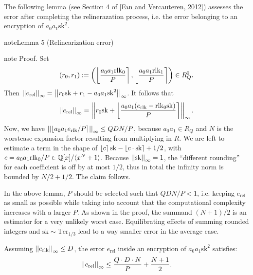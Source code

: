 \documentclass[letterpaper,10pt,english]{jupyterBook}
\begin{document}
\sphinxAtStartPar
The following lemma (see Section 4 of {[}\hyperlink{cite.Thesis:id70}{Fan and Vercauteren, 2012}{]}) assesses the error after completing the relinerazation process, i.e. the error belonging to an encryption of \(a_0a_1\mathrm{sk}^2\).
\label{Thesis:relinearization-error}
\begin{sphinxadmonition}{note}{Lemma 5 (Relinearization error)}
\end{sphinxadmonition}

\begin{sphinxadmonition}{note}
\sphinxAtStartPar
Proof. Set
\begin{equation*}
\begin{split}(r_0,r_1) := \left( \left\lfloor \frac{a_0a_1 \mathrm{rlk}_0}{P} \right\rceil, \left\lfloor \frac{a_0a_1 \mathrm{rlk}_1}{P} \right\rceil \right) \in R_Q^2.\end{split}
\end{equation*}
\sphinxAtStartPar
Then \(\left\lvert\left\lvert e_{\text{rel}} \right\rvert\right\rvert_\infty = \left\lvert\left\lvert r_0 \mathrm{sk} + r_1 - a_0a_1\mathrm{sk}^2 \right\rvert\right\rvert_\infty\).
It follows that
\begin{equation*}
\begin{split}\left\lvert\left\lvert e_{\text{rel}} \right\rvert\right\rvert_\infty = \left\lvert\left\lvert r_0 \mathrm{sk} + \left\lfloor \frac{a_0a_1(e_{\text{rlk}} - \mathrm{rlk}_0 \mathrm{sk})}{P} \right\rceil \right\rvert\right\rvert_\infty.\end{split}
\end{equation*}
\sphinxAtStartPar
Now, we have \(\left\lvert\left\lvert \left\lfloor a_0a_1e_{\text{rlk}}/P \right\rceil \right\rvert\right\rvert_\infty \le QDN/P\), because \(a_0a_1 \in R_Q\) and \(N\) is the worst\sphinxhyphen{}case expansion factor resulting from multiplying in \(R\).
We are left to estimate a term in the shape of \(\left\lfloor c \right\rceil \mathrm{sk} - \left\lfloor c \cdot \mathrm{sk} \right\rceil + 1/2\), with \(c = a_0a_1\mathrm{rlk}_0/P \in \mathbb Q[x]/\langle x^N + 1\rangle\).
Because \(\left\lvert\left\lvert \mathrm{sk} \right\rvert\right\rvert_\infty = 1\), the “different rounding” for each coefficient is off by at most \(1/2\), thus in total the infinity norm is bounded by \(N/2 + 1/2\).
The claim follows.
\end{sphinxadmonition}

\sphinxAtStartPar
In the above lemma, \(P\) should be selected such that \(QDN/P < 1\), i.e. keeping \(e_{\text{rel}}\) as small as possible while taking into account that the computational complexity increases with a larger \(P\).
As shown in the proof, the summand \((N+1)/2\) is an estimator for a very unlikely worst case.
Equilibrating effects of summing rounded integers and \(\mathrm{sk} \sim \mathrm{Ter}_{1/3}\) lead to a way smaller error in the average case.

\sphinxAtStartPar
Assuming \(\left\lvert\left\lvert e_{\text{rlk}} \right\rvert\right\rvert_\infty \le D\), the error \(e_{\text{rel}}\) inside an encryption of \(a_0a_1\mathrm{sk}^2\) satisfies:
\begin{equation*}
\begin{split}\left\lvert\left\lvert e_{\text{rel}} \right\rvert\right\rvert_\infty \le \frac{Q\cdot D \cdot N}{P} + \frac{N+1}{2}.\end{split}
\end{equation*}
\begin{DUlineblock}{0em}
\item[] 
\end{DUlineblock}
\end{document}
